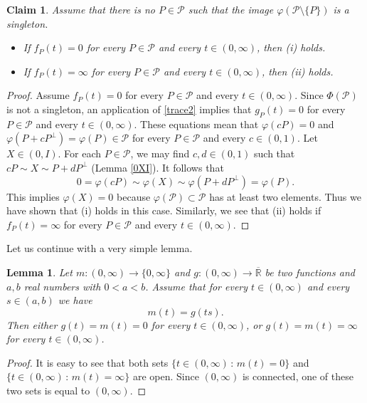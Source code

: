 \documentclass[10pt]{amsart}
\newtheorem{lemma}[theorem]{Lemma}
\newtheorem{claim}[theorem]{Claim}
\theoremstyle{definition}
\theoremstyle{remark}
\numberwithin{subsection}{section}
\numberwithin{equation}{section}
\newcommand\cP{{\mathcal{P}}}
\newcommand\oR{{\overline{\mathbb{R}}}}
\begin{document}
\begin{claim}\label{iorii}
Assume that there is no $P\in \mathcal{P}$ such that the image $\varphi(\mathcal{P}\setminus \{P\})$ is a singleton.
\begin{itemize}
\item If $f_P(t)=0$ for every $P\in \cP$ and every $t\in (0,\infty)$, then (i) holds. 
\item If $f_P(t)=\infty$ for every $P\in \cP$ and every $t\in (0,\infty)$, then (ii) holds. 
\end{itemize}
\end{claim}
\begin{proof}
Assume $f_P(t)=0$ for every $P\in \cP$ and every $t\in (0,\infty)$. 
Since $\Phi(\cP)$ is not a singleton,  an application of \eqref{trace2} implies that $g_P(t)=0$ for every $P\in \cP$ and every $t\in (0,\infty)$. 
These equations mean that $\varphi(cP)=0$ and $\varphi(P+cP^\perp)=\varphi(P)\in \cP$ for every $P\in \cP$ and every $c\in (0,1)$. 
Let $X\in (0, I)$. 
For each $P\in \cP$, we may find $c, d\in (0, 1)$ such that $cP\sim X\sim P+dP^\perp$ (Lemma \ref{0XI}). 
It follows that 
\[
0=\varphi(cP)\sim \varphi(X)\sim \varphi(P+dP^\perp)=\varphi(P). 
\]
This implies $\varphi(X)=0$ because $\varphi(\cP)\subset\cP$ has at least two elements.
Thus we have shown that (i) holds in this case. 
Similarly, we see that (ii) holds if $f_P(t)=\infty$ for every $P\in \cP$ and every $t\in (0,\infty)$. 
\end{proof}

Let us continue with a very simple lemma.

\begin{lemma}\label{qapl}
Let $m \colon ( 0, \infty) \to \{ 0 ,\infty \}$ and $g\colon  ( 0, \infty) \to {\oR}$ be two functions and $a,b$ real numbers with $0 < a < b$. Assume that for every $t \in (0, \infty)$ and every $s \in (a,b)$ we have
\[
m(t) = g(ts).
\]
Then either $g(t) = m(t) = 0$ for every $t \in (0, \infty)$, or $g(t) = m(t) =\infty$ for every $t \in (0, \infty)$.
\end{lemma}

\begin{proof}
It is easy to see that both sets $\{ t \in ( 0, \infty) \, : \, m(t) = 0 \}$ and  $\{ t \in ( 0, \infty) \, : \, m(t) = \infty \}$ are open. Since $(0, \infty)$ is connected, one of these two sets is equal to $(0, \infty)$.
\end{proof}
\end{document}
